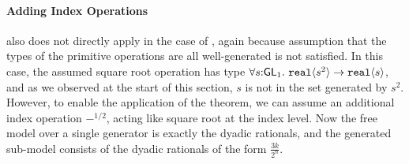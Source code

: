 \paragraph{Adding Index Operations}  also
does not directly apply in the case of ,
again because assumption that the types of the primitive operations
are all well-generated is not satisfied. In this case, the assumed
square root operation has type $\forall
s\mathord:\mathsf{GL}_1.~\textup{\texttt{real}}\langle s^2 \rangle \to \textup{\texttt{real}}\langle s \rangle$, and as
we observed at the start of this section, $s$ is not in the set
generated by $s^2$. However, to enable the application of the theorem,
we can assume an additional index operation $-^{1/2}$, acting
like square root at the index level. Now the free model over a single
generator is exactly the dyadic rationals, and the generated sub-model
consists of the dyadic rationals of the form $\frac{3k}{2^n}$.


